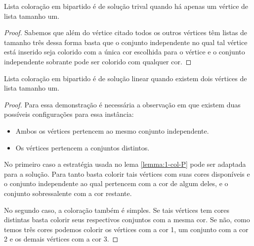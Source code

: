 \begin{teorema}
\label{lemma:1-col-P}
 Lista coloração em bipartido é de solução trival quando há apenas um vértice de lista tamanho um.
\end{teorema}
\begin{proof}
 Sabemos que além do vértice citado todos os outros vértices têm listas de tamanho três dessa forma basta que o conjunto independente no qual tal vértice está inserido seja colorido com a única cor escolhida para o vértice e o conjunto independente sobrante pode ser colorido com qualquer cor.
\end{proof}

\begin{teorema}
 Lista coloração em bipartido é de solução linear quando existem dois vértices de lista tamanho um.
\end{teorema}
\begin{proof}
 Para essa demonstração é necessária a observação em que existem duas possíveis configurações para essa instância:
 \begin{itemize}
   \item Ambos os vértices pertencem ao mesmo conjunto independente.
   \item Os vértices pertencem a conjuntos distintos.
 \end{itemize} 
 No primeiro caso a estratégia usada no lema \ref{lemma:1-col-P} pode ser adaptada para a solução. Para tanto basta colorir tais vértices com suas cores disponíveis e o conjunto independente ao qual pertencem com a cor de algum deles, e o conjunto sobressalente com a cor restante.
 
 No segundo caso, a coloração também é simples. Se tais vértices tem cores distintas basta colorir seus respectivos conjuntos com a mesma cor. Se não, como temos três cores podemos colorir os vértices com a cor 1, um conjunto com a cor 2 e os demais vértices com a cor 3.  
\end{proof}

